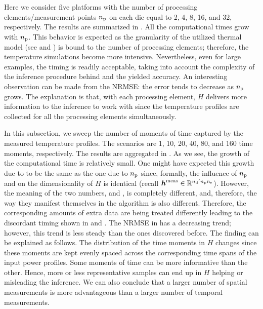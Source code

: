 Here we consider five platforms with the number of processing
elements/measurement points ${n_\mathrm{p}}$ on each die equal to 2, 4, 8, 16, and 32,
respectively. The results are summarized in . All the
computational times grow with ${n_\mathrm{p}}$. This behavior is expected as the
granularity of the utilized thermal model (see  and
\cite{ukhov2012}) is bound to the number of processing elements; therefore, the
temperature simulations become more intensive. Nevertheless, even for large
examples, the timing is readily acceptable, taking into account the complexity
of the inference procedure behind and the yielded accuracy. An interesting
observation can be made from the NRMSE: the error tends to decrease as ${n_\mathrm{p}}$
grows. The explanation is that, with each processing element, $H$ delivers
more information to the inference to work with since the temperature profiles
are collected for all the processing elements simultaneously.

In this subsection, we sweep the number of moments of time \ns captured by the
measured temperature profiles. The scenarios are 1, 10, 20, 40, 80, and 160 time
moments, respectively. The results are aggregated in
. As we see, the growth of the computational time is
relatively small. One might have expected this growth due to \ns to be the same
as the one due to ${n_\mathrm{p}}$ since, formally, the influence of ${n_\mathrm{p}}$ and \ns on the
dimensionality of $H$ is identical (recall $\boldsymbol{h}^{\mathrm{meas}} \in \mathbb{R}^{{n_\mathrm{d}}' {n_\mathrm{p}}
{n_\mathrm{s}}}$). However, the meaning of the two numbers, \np and \ns, is completely
different, and, therefore, the way they manifest themselves in the algorithm is
also different. Therefore, the corresponding amounts of extra data are being
treated differently leading to the discordant timing shown in
 and . The NRMSE in
 has a decreasing trend; however, this trend is less
steady than the ones discovered before. The finding can be explained as follows.
The distribution of the time moments in $H$ changes since these moments are kept
evenly spaced across the corresponding time spans of the input power profiles.
Some moments of time can be more informative than the other. Hence, more or less
representative samples can end up in $H$ helping or misleading the inference. We
can also conclude that a larger number of spatial measurements is more
advantageous than a larger number of temporal measurements.


